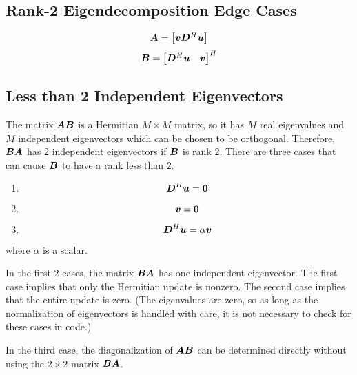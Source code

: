 \begin{appendices}
\chapter{Rank-2 Eigendecomposition Edge Cases} \label{chapter:eigenedge}
\begin{equation}
\bm{A} = \begin{bmatrix}  \bm{v}   \bm{D}^H\bm{u} \end{bmatrix}
\end{equation}
\begin{equation}
\bm{B} = \begin{bmatrix} \bm{D}^H\bm{u} & \bm{v}\end{bmatrix}^H
\end{equation}
\section{Less than 2 Independent Eigenvectors}




The matrix $\bm{A}\bm{B}$ is a Hermitian $M \times M$ matrix, so it has $M$ real eigenvalues and $M$ independent eigenvectors which can be chosen to be orthogonal. Therefore, $\bm{B}\bm{A}$ has $2$ independent eigenvectors if $\bm{B}$ is rank $2$.  There are three cases that can cause $\bm{B}$ to have a rank less than $2$.


\begin{enumerate}
\item
\begin{equation}
\bm{D}^H\bm{u} = \bm{0}
\end{equation}
\item

\begin{equation}
\bm{v} = \bm{0}
\end{equation}
\item
\begin{equation}
\bm{D}^H\bm{u} = \alpha \bm{v}
\end{equation}
\end{enumerate}
where $\alpha$ is a scalar.

In the first $2$ cases, the matrix $\bm{B}\bm{A}$ has one independent eigenvector. The first case implies that only the Hermitian update is nonzero.  The second case implies that the entire update is zero. (The eigenvalues are zero, so as long as the normalization of eigenvectors is handled with care, it is not necessary to check for these cases in code.)

In the third case, the diagonalization of $\bm{A}\bm{B}$ can be determined directly without using the $2 \times 2$ matrix $\bm{B}\bm{A}$.


\end{appendices}
